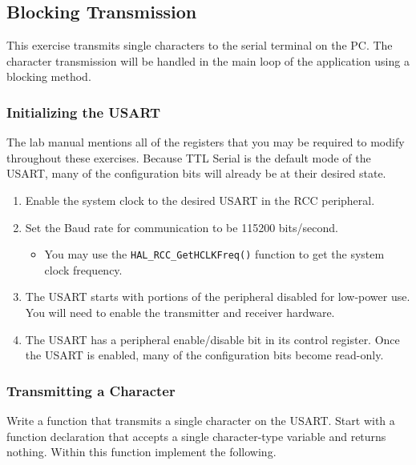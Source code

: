 \documentclass[openany,11pt,fleqn]{book} %
\begin{document}
\subsection{Blocking Transmission}	
This exercise transmits single characters to the serial terminal on the PC. The character transmission will be handled in the main loop of the application using a blocking method. 

\subsubsection{Initializing the USART}
The lab manual mentions all of the registers that you may be required to modify throughout these exercises. Because TTL Serial is the default mode of the USART, many of the configuration bits will already be at their desired state. 

\begin{enumerate}
 \item Enable the system clock to the desired USART in the RCC peripheral.
 \item Set the Baud rate for communication to be 115200 bits/second. 
 \begin{itemize}
     \item You may use the \texttt{HAL\_RCC\_GetHCLKFreq()} function to get the system clock frequency. 
 \end{itemize}
 \item The USART starts with portions of the peripheral disabled for low-power use. You will need to enable the transmitter and receiver hardware.
 \item The USART has a peripheral enable/disable bit in its control register. Once the USART is enabled, many of the configuration bits become read-only.  
\end{enumerate}

\subsubsection{Transmitting a Character}

Write a function that transmits a single character on the USART. Start with a function declaration that accepts a single character-type variable and returns nothing. Within this function implement the following.
\end{document}
